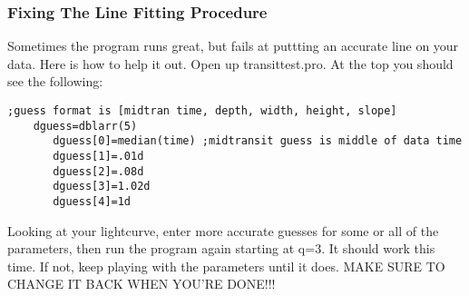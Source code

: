 \documentclass[10pt,preprint]{aastex}
\begin{document}
\subsubsection{Fixing The Line Fitting Procedure}
Sometimes the program runs great, but fails at puttting an accurate line on your data. Here is how to help it out. 
Open up transittest.pro. At the top you should see the following:


\begin{verbatim}
;guess format is [midtran time, depth, width, height, slope]
    dguess=dblarr(5)
       dguess[0]=median(time) ;midtransit guess is middle of data time
       dguess[1]=.01d
       dguess[2]=.08d
       dguess[3]=1.02d
       dguess[4]=1d
\end{verbatim}

Looking at your lightcurve, enter more accurate guesses for some or all of the parameters, then run the program again starting at q=3. It should work this time. If not, keep playing with the parameters until it does.
MAKE SURE TO CHANGE IT BACK WHEN YOU'RE DONE!!!
\end{document}
